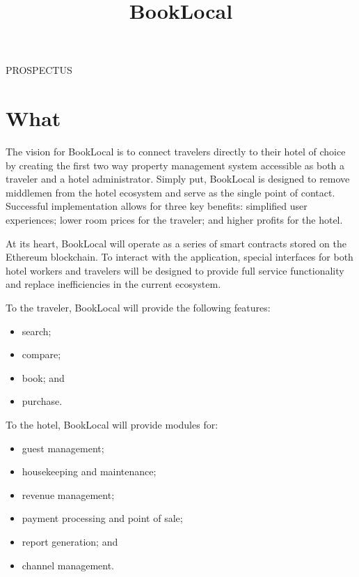 \documentclass{article}
\title{BookLocal}
\begin{document}
\maketitle

\begin{flushleft}
\centering PROSPECTUS
\end{flushleft}

\newpage
\tableofcontents

\newpage

\section{What}
The vision for BookLocal is to connect travelers directly to their hotel of choice by creating the first two way property management system accessible as both a traveler and a hotel administrator. Simply put, BookLocal is designed to remove middlemen from the hotel ecosystem and serve as the single point of contact. Successful implementation allows for three key benefits: simplified user experiences; lower room prices for the traveler; and higher profits for the hotel.  

\begin{flushleft}
At its heart, BookLocal will operate as a series of smart contracts stored on the Ethereum blockchain. To interact with the application, special interfaces for both hotel workers and travelers will be designed to provide full service functionality and replace inefficiencies in the current ecosystem.
\end{flushleft}

\begin{flushleft}
To the traveler, BookLocal will provide the following features:
\begin{itemize}
 \item search;
 \item compare;
 \item book; and
 \item purchase.
\end{itemize}
\end{flushleft}

\begin{flushleft}
To the hotel, BookLocal will provide modules for:
\begin{itemize}
 \item guest management;
 \item housekeeping and maintenance;
 \item revenue management;
 \item payment processing and point of sale;
 \item report generation; and
 \item channel management.
\end{itemize}
\end{flushleft}
\end{document}
